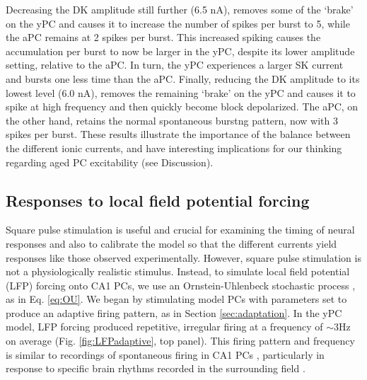 \documentclass[12pt]{article}
\begin{document}
Decreasing the DK amplitude still further (6.5 nA), removes some of the `brake' on the yPC and causes it to increase the number of spikes per burst to 5, while the aPC remains at 2 spikes per burst. This increased spiking causes the {\Ca} accumulation per burst to now be larger in the yPC, despite its lower amplitude setting, relative to the aPC. In turn, the yPC experiences a larger SK current and bursts one less time than the aPC. Finally, reducing the DK amplitude to its lowest level (6.0 nA), removes the remaining `brake' on the yPC and causes it to spike at high frequency and then quickly become block depolarized. The aPC, on the other hand, retains the normal spontaneous burstng pattern, now with 3 spikes per burst. These results illustrate the importance of the balance between the different ionic currents, and have interesting implications for our thinking regarding aged PC excitability (see Discussion).

\subsection{Responses to local field potential forcing}
Square pulse stimulation is useful and crucial for examining the timing of neural responses and also to calibrate the model so that the different currents yield responses like those observed experimentally. However, square pulse stimulation is not a physiologically realistic stimulus. Instead, to simulate local field potential (LFP) forcing onto CA1 PCs, we use an Ornstein-Uhlenbeck stochastic process \citep{rudolph2004method,destexhe2004novel}, as in Eq. \ref{eq:OU}. We began by stimulating model PCs with parameters set to produce an adaptive firing pattern, as in Section \ref{sec:adaptation}. In the yPC model, LFP forcing produced repetitive, irregular firing at a frequency of $\sim$3Hz on average (Fig. \ref{fig:LFPadaptive}, top panel). This firing pattern and frequency is similar to recordings of spontaneous firing in CA1 PCs \citep{manseau2017tuning,yang2017dl}, particularly in response to specific brain rhythms recorded in the surrounding field \citep{bland2002relationship,bland2005heterogeneity,huh2016excitatory}.
\end{document}
